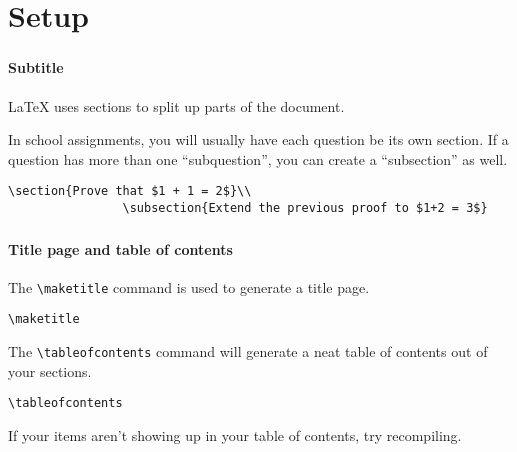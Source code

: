 \documentclass{beamer}
\begin{document}
	\section{Setup}
	\begin{frame}[fragile]
		\frametitle{\secname}
		\framesubtitle{Subtitle}
		\LaTeX{} uses \alert{sections} to split up parts of the document.

		In school assignments, you will usually have each question be its own section. If a question has more than one ``subquestion'', you can create a ``subsection'' as well.
		\begin{example}
			\begin{lstlisting}[numbers=none, gobble=16]
				\section{Prove that $1 + 1 = 2$}\\
				\subsection{Extend the previous proof to $1+2 = 3$}
			\end{lstlisting}
		\end{example}
	\end{frame}
	\begin{frame}[fragile]
		\frametitle{\secname}
		\framesubtitle{Title page and table of contents}
		The \lstinline{\maketitle} command is used to generate a title page.
		\begin{example}
			\begin{lstlisting}[numbers=none, gobble=16]
				\maketitle
			\end{lstlisting}
		\end{example}
		
		The \lstinline{\tableofcontents} command will generate a neat table of contents out of your sections.
		\begin{example}
			\begin{lstlisting}[numbers=none, gobble=16]
				\tableofcontents
			\end{lstlisting}
		\end{example}
		If your items aren't showing up in your table of contents, try recompiling.
	\end{frame}
\end{document}
